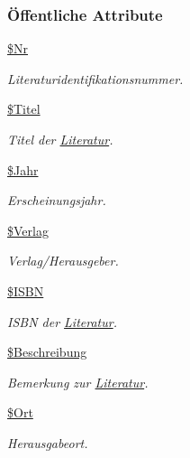 \subsubsection*{\"{O}ffentliche Attribute}
\begin{CompactItemize}
\item 
\hyperlink{classLiteratur_036a682a93a5d50839c1ebc70a79d4b6}{\$Nr}
\begin{CompactList}\small\item\em Literaturidentifikationsnummer. \item\end{CompactList}\item 
\hyperlink{classLiteratur_e30f9e9db9b396e6f87adfdb94e12ba0}{\$Titel}
\begin{CompactList}\small\item\em Titel der \hyperlink{classLiteratur}{Literatur}. \item\end{CompactList}\item 
\hyperlink{classLiteratur_2cb6f40a8757a0edd5da32385ad009c9}{\$Jahr}
\begin{CompactList}\small\item\em Erscheinungsjahr. \item\end{CompactList}\item 
\hyperlink{classLiteratur_5f591208e5d21bb81e6c51484e2a60e0}{\$Verlag}
\begin{CompactList}\small\item\em Verlag/Herausgeber. \item\end{CompactList}\item 
\hyperlink{classLiteratur_9e3b00766297a68adac423980767dd3c}{\$ISBN}
\begin{CompactList}\small\item\em ISBN der \hyperlink{classLiteratur}{Literatur}. \item\end{CompactList}\item 
\hyperlink{classLiteratur_6769ff8b353d2f789125f009b4dcfdc0}{\$Beschreibung}
\begin{CompactList}\small\item\em Bemerkung zur \hyperlink{classLiteratur}{Literatur}. \item\end{CompactList}\item 
\hyperlink{classLiteratur_da6c458bb229187efea8e8f144a1d279}{\$Ort}
\begin{CompactList}\small\item\em Herausgabeort. \item\end{CompactList}\item 

\end{CompactItemize}
